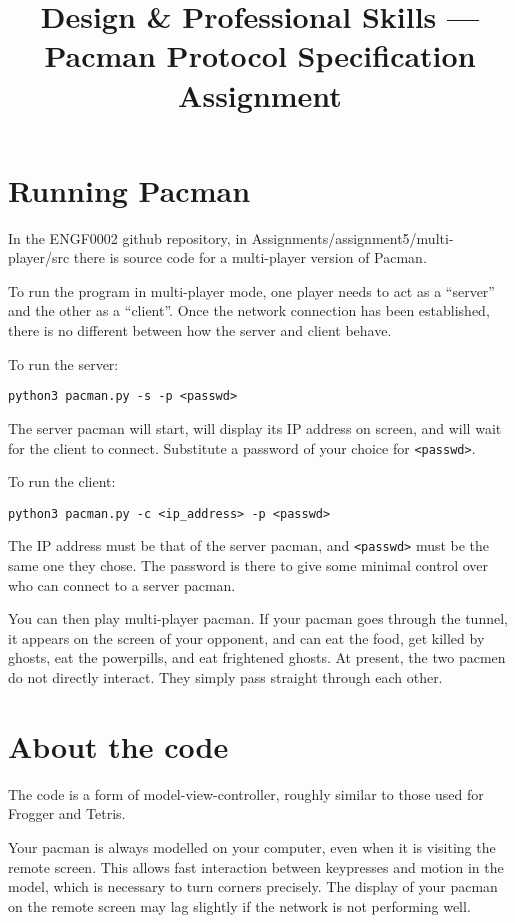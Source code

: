 \documentclass{article}
\title{Design \& Professional Skills --- Pacman Protocol Specification Assignment}
\author{}
\date{}
\begin{document}
\maketitle

\section{Running Pacman}

In the ENGF0002 github repository, in Assignments/assignment5/multi-player/src there is source code for a multi-player version of Pacman.

To run the program in multi-player mode, one player needs to act as a
``server'' and the other as a ``client''.  Once the network connection
has been established, there is no different between how the server and
client behave.

To run the server:

\begin{verbatim}
python3 pacman.py -s -p <passwd>
\end{verbatim}

The server pacman will start, will display its IP address on screen,
and will wait for the client to connect.  Substitute a password of your choice for {\tt <passwd>}.

To run the client:

\begin{verbatim}
python3 pacman.py -c <ip_address> -p <passwd>
\end{verbatim}

The IP address must be that of the server pacman, and {\tt <passwd>} must be
the same one they chose.  The password is there to give some minimal
control over who can connect to a server pacman.

You can then play multi-player pacman.  If your pacman goes through
the tunnel, it appears on the screen of your opponent, and can eat the
food, get killed by ghosts, eat the powerpills, and eat frightened
ghosts.  At present, the two pacmen do not directly interact.  They
simply pass straight through each other.

\newpage
\section{About the code}

The code is a form of model-view-controller, roughly similar to those
used for Frogger and Tetris.

Your pacman is always modelled on your computer, even when it is
visiting the remote screen.  This allows fast interaction between
keypresses and motion in the model, which is necessary to turn corners
precisely.  The display of your pacman on the remote screen may lag
slightly if the network is not performing well.
\end{document}
